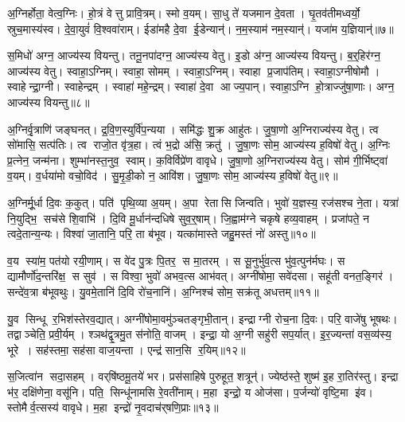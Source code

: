 अ॒ग्निर्\mbox{}होता॒ वेत्व॒ग्निः।
हो॒त्रं वेत्तु प्रावि॒त्रम्।
स्मो व॒यम्।
सा॒धु ते॑ यजमान दे॒वता।
घृ॒तव॑तीमध्वर्यो॒ स्रुच॒मास्य॑स्व।
दे॒वा॒युवं॑ वि॒श्ववा॑राम्।
ईडा॑महै दे॒वा ई॒डेन्यान्॑।
न॒म॒स्याम॑ नम॒स्यान्॑।
यजा॑म य॒ज्ञियान्॑॥७॥\anuvakamend[अ॒ग्निर्‌होता॒ नव॑]

स॒मिधो॑ अग्न॒ आज्य॑स्य वियन्तु।
तनू॒नपा॑दग्न॒ आज्य॑स्य वेतु।
इ॒डो अ॑ग्न॒ आज्य॑स्य वियन्तु।
ब॒र्॒हिर॑ग्न॒ आज्य॑स्य वेतु।
स्वाहा॒ऽग्निम्।
स्वाहा॒ सोमम्।
स्वाहा॒ऽग्निम्।
स्वाहा प्र॒जाप॑तिम्।
स्वाहा॒ऽग्नीषोमौ।
स्वाहेन्द्रा॒ग्नी।
स्वाहेन्द्रम्।
स्वाहा॑ महे॒न्द्रम्।
स्वाहा॑ दे॒वा आज्य॒पान्।
स्वाहा॒ऽग्नि हो॒त्राज्जु॑षा॒णाः।
अग्न॒ आज्य॑स्य वियन्तु॥८॥\anuvakamend[इ॒न्द्रा॒ग्नी पञ्च॑ च]

अ॒ग्निर्वृ॒त्राणि॑ जङ्घनत्।
द्र॒वि॒ण॒स्युर्वि॑प॒न्यया।
समि॑द्धः शु॒क्र आहु॑तः।
जु॒षा॒णो अ॒ग्निराज्य॑स्य वेतु।
त्व सो॑मासि॒ सत्प॑तिः।
त्व राजो॒त वृ॑त्र॒हा।
त्वं भ॒द्रो अ॑सि॒ क्रतु॑।
जु॒षा॒णः सोम॒ आज्य॑स्य ह॒विषो॑ वेतु।
अ॒ग्निः प्र॒त्नेन॒ जन्म॑ना।
शुम्भा॑नस्त॒नुव॒ स्वाम्।
क॒विर्विप्रे॑ण वावृधे।
जु॒षा॒णो अ॒ग्निराज्य॑स्य वेतु।
सोम॑ गी॒र्भिष्ट्वा॑ व॒यम्।
व॒र्धया॑मो वचो॒विद॑।
सु॒मृ॒डी॒को न॒ आवि॑श।
जु॒षा॒णः सोम॒ आज्य॑स्य ह॒विषो॑ वेतु॥९॥\anuvakamend[स्वा षट् च॑]

अ॒ग्निर्मू॒र्धा दि॒वः क॒कुत्।
पति॑ पृथि॒व्या अ॒यम्।
अ॒पा रेतासि जिन्वति।
भुवो॑ य॒ज्ञस्य॒ रज॑सश्च ने॒ता।
यत्रा॑ नि॒युद्भि॒ सच॑से शि॒वाभि॑।
दि॒वि मू॒र्धान॑न्दधिषे सुव॒र्॒षाम्।
जि॒ह्वाम॑ग्ने चकृषे हव्य॒वाहम्।
प्रजा॑पते॒ न त्वदे॒तान्य॒न्यः।
विश्वा॑ जा॒तानि॒ परि॒ ता ब॑भूव।
यत्का॑मास्ते जहु॒मस्तं नो॑ अस्तु॥१०॥

व॒य स्या॑म॒ पत॑यो रयी॒णाम्।
स वे॑द पु॒त्रः पि॒तर॒ स मा॒तरम्।
स सू॒नुर्भु॑व॒त्स भु॑व॒त्पुन॑र्मघः।
स द्यामौर्णो॑द॒न्तरि॑क्ष॒ स सुव॑।
स विश्वा॒ भुवो॑ अभव॒त्स आभ॑वत्।
अग्नी॑षोमा॒ सवे॑दसा।
सहू॑ती वनत॒ङ्गिर॑।
सन्दे॑व॒त्रा ब॑भूवथुः।
यु॒वमे॒तानि॑ दि॒वि रो॑च॒नानि॑।
अ॒ग्निश्च॑ सोम॒ सक्र॑तू अधत्तम्॥११॥

यु॒व सिन्धू र॒भिश॑स्तेरव॒द्यात्।
अग्नी॑षोमा॒वमु॑ञ्चतङ्गृभी॒तान्।
इन्द्राग्नी रोच॒ना दि॒वः।
परि॒ वाजे॑षु भूषथः।
तद्वाञ्चेति॒ प्रवी॒र्यम्।
श्ञथ॑द्वृ॒त्रमु॒त स॑नोति॒ वाजम्।
इन्द्रा॒ यो अ॒ग्नी सहु॑री सप॒र्यात्।
इ॒र॒ज्यन्ता॑ वस॒व्य॑स्य॒ भूरे।
सह॑स्तमा॒ सह॑सा वाज॒यन्ता।
एन्द्र॑ सान॒सि र॒यिम्॥१२॥

स॒जित्वा॑न सदा॒सहम्।
वर्‌षि॑ष्ठमू॒तये॑ भर।
प्रस॑साहिषे पुरुहूत॒ शत्रून्॑।
ज्येष्ठ॑स्ते॒ शुष्म॑ इ॒ह रा॒तिर॑स्तु।
इन्द्रा भ॑र॒ दक्षि॑णेना॒ वसू॑नि।
पति॒ सिन्धू॑नामसि रे॒वती॑नाम्।
म॒हा इन्द्रो॒ य ओज॑सा।
प॒र्जन्यो॑ वृष्टि॒मा इ॑व।
स्तोमैर्व॒त्सस्य॑ वावृधे।
म॒हा इन्द्रो॑ नृ॒वदाच॑र्‌षणि॒प्राः॥१३॥


